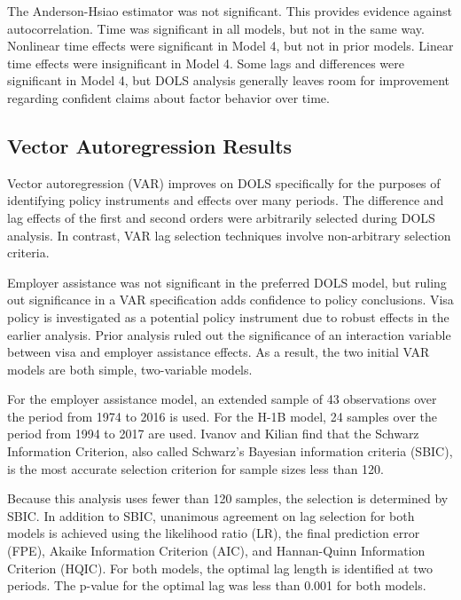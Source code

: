 \documentclass[review]{elsarticle}
\begin{document}
The Anderson-Hsiao estimator was not significant.
This provides evidence against autocorrelation.
Time was significant in all models, but not in the same way.
Nonlinear time effects were significant in Model 4, but not in prior models.
Linear time effects were insignificant in Model 4.
Some lags and differences were significant in Model 4,
but DOLS analysis generally leaves room for improvement regarding confident
claims about factor behavior over time.

\subsection{Vector Autoregression Results}
Vector autoregression (VAR) improves on DOLS specifically for the purposes
of identifying policy instruments and effects over many periods.
The difference and lag effects of the first and second orders were arbitrarily selected during DOLS analysis.
In contrast, VAR lag selection techniques involve non-arbitrary selection criteria.

Employer assistance was not significant in the preferred DOLS model,
but ruling out significance in a VAR specification adds confidence to policy conclusions.
Visa policy is investigated as a potential policy instrument due to robust effects in the earlier analysis.
Prior analysis ruled out the significance of an interaction variable between
visa and employer assistance effects.
As a result, the two initial VAR models are both simple, two-variable models.

For the employer assistance model,
an extended sample of 43 observations
over the period from 1974 to 2016 is used.
For the H-1B model, 24 samples over the period from 1994 to 2017 are used.
Ivanov and Kilian find that the Schwarz Information Criterion,
also called Schwarz's Bayesian information criteria (SBIC),
is the most accurate selection criterion for sample sizes less than 120\cite{ivanov2005practitioner}.

Because this analysis uses fewer than 120 samples, the selection is determined by SBIC.
In addition to SBIC, unanimous agreement on lag selection for both models is achieved using the likelihood ratio (LR),
the final prediction error (FPE), Akaike Information Criterion (AIC), and Hannan-Quinn Information Criterion (HQIC).
For both models, the optimal lag length is identified at two periods.
The p-value for the optimal lag was less than 0.001 for both models.
\end{document}
